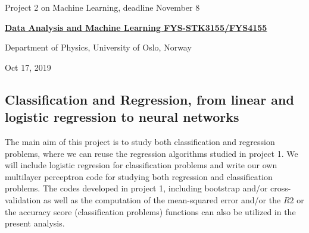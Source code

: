 \documentclass[%
oneside,                 %
final,                   %
10pt]{article}
\begin{document}

\newcommand{\exercisesection}[1]{\subsection*{#1}}






\thispagestyle{empty}

\begin{center}
{\LARGE\bf
\begin{spacing}{1.25}
Project 2 on Machine Learning, deadline November 8
\end{spacing}
}
\end{center}


\begin{center}
{\bf \href{{http://www.uio.no/studier/emner/matnat/fys/FYS3155/index-eng.html}}{Data Analysis and Machine Learning FYS-STK3155/FYS4155}}
\end{center}

    \begin{center}
\centerline{{\small Department of Physics, University of Oslo, Norway}}
\end{center}
    

\begin{center}
Oct 17, 2019
\end{center}

\vspace{1cm}


\subsection*{Classification and Regression, from linear and logistic regression to neural networks}

The main aim of this project is to study both classification and
regression problems, where we can reuse the regression algorithms studied
in project 1. We will include logistic regresion for classification
problems and write our own multilayer perceptron code for studying
both regression and classification problems.  The codes developed in
project 1, including bootstrap and/or cross-validation as well as the
computation of the mean-squared error and/or the $R2$ or the accuracy score (classification problems) functions can
also be utilized in the present analysis. 
\end{document}
